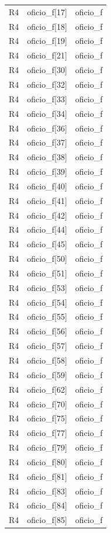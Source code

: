 \begin{longtable}{lll}
R4 & oficio\_f[17] & oficio\_f \\
R4 & oficio\_f[18] & oficio\_f \\
R4 & oficio\_f[19] & oficio\_f \\
R4 & oficio\_f[21] & oficio\_f \\
R4 & oficio\_f[30] & oficio\_f \\
R4 & oficio\_f[32] & oficio\_f \\
R4 & oficio\_f[33] & oficio\_f \\
R4 & oficio\_f[34] & oficio\_f \\
R4 & oficio\_f[36] & oficio\_f \\
R4 & oficio\_f[37] & oficio\_f \\
R4 & oficio\_f[38] & oficio\_f \\
R4 & oficio\_f[39] & oficio\_f \\
R4 & oficio\_f[40] & oficio\_f \\
R4 & oficio\_f[41] & oficio\_f \\
R4 & oficio\_f[42] & oficio\_f \\
R4 & oficio\_f[44] & oficio\_f \\
R4 & oficio\_f[45] & oficio\_f \\
R4 & oficio\_f[50] & oficio\_f \\
R4 & oficio\_f[51] & oficio\_f \\
R4 & oficio\_f[53] & oficio\_f \\
R4 & oficio\_f[54] & oficio\_f \\
R4 & oficio\_f[55] & oficio\_f \\
R4 & oficio\_f[56] & oficio\_f \\
R4 & oficio\_f[57] & oficio\_f \\
R4 & oficio\_f[58] & oficio\_f \\
R4 & oficio\_f[59] & oficio\_f \\
R4 & oficio\_f[62] & oficio\_f \\
R4 & oficio\_f[70] & oficio\_f \\
R4 & oficio\_f[75] & oficio\_f \\
R4 & oficio\_f[77] & oficio\_f \\
R4 & oficio\_f[79] & oficio\_f \\
R4 & oficio\_f[80] & oficio\_f \\
R4 & oficio\_f[81] & oficio\_f \\
R4 & oficio\_f[83] & oficio\_f \\
R4 & oficio\_f[84] & oficio\_f \\
R4 & oficio\_f[85] & oficio\_f \\

\end{longtable}
